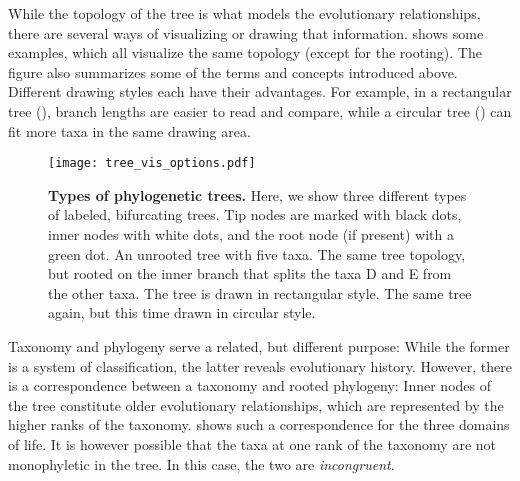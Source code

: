 While the topology of the tree is what models the evolutionary relationships,
there are several ways of visualizing or drawing that information.
 shows some examples, which all visualize the same topology (except for the rooting).
The figure also summarizes some of the terms and concepts introduced above.
Different drawing styles each have their advantages.
For example, in a rectangular tree (),
branch lengths are easier to read and compare,
while a circular tree () can fit more taxa in the same drawing area.

\begin{figure}[hpbt]
    \centering
    \texttt{[image: tree\_vis\_options.pdf]}
    \begin{subfigure}{0pt}
        \label{fig:tree_vis_options:sub:unrooted}
    \end{subfigure}
    \begin{subfigure}{0pt}
        \label{fig:tree_vis_options:sub:rectangular}
    \end{subfigure}
    \begin{subfigure}{0pt}
        \label{fig:tree_vis_options:sub:circular}
    \end{subfigure}
    \caption[Types of phylogenetic trees]{
        \textbf{Types of phylogenetic trees.}
        Here, we show three different types of labeled, bifurcating trees.
        Tip nodes are marked with black dots, inner nodes with white dots, and the root node (if present) with a green dot.
         An unrooted tree with five taxa.
         The same tree topology,
        but rooted on the inner branch that splits the taxa {\sffamily D} and {\sffamily E} from the other taxa.
        The tree is drawn in rectangular style.
         The same tree again, but this time drawn in circular style.
    }
    \label{fig:tree_vis_options}
\end{figure}

Taxonomy and phylogeny serve a related, but different purpose:
While the former is a system of classification,
the latter reveals evolutionary history.
However, there is a correspondence between a taxonomy and rooted phylogeny:
Inner nodes of the tree constitute older evolutionary relationships,
which are represented by the higher ranks of the taxonomy.
 shows such a correspondence for the three domains of life.
It is however possible that the taxa at one rank of the taxonomy are not monophyletic in the tree.
In this case, the two are \emph{incongruent}.


